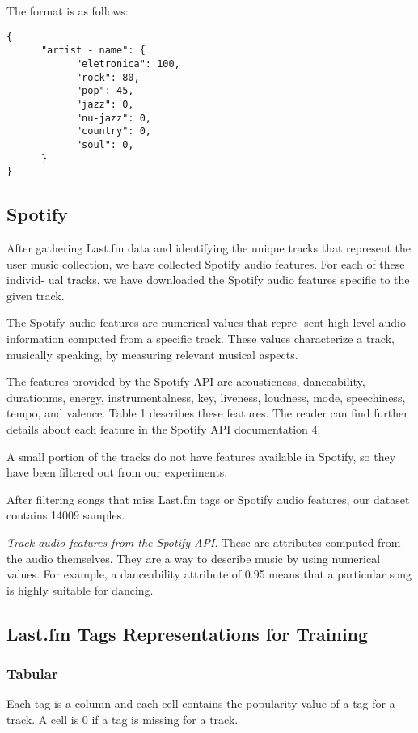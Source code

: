 \documentclass[fleqn,10pt]{olplainarticle}
\begin{document}
The format is as follows:

\begin{verbatim}
{
      "artist - name": {
            "eletronica": 100,
            "rock": 80,
            "pop": 45,
            "jazz": 0,
            "nu-jazz": 0,
            "country": 0,
            "soul": 0,
      }
}
\end{verbatim}


\subsection*{Spotify}

After gathering Last.fm data and identifying the unique
tracks that represent the user music collection, we have
collected Spotify audio features. For each of these individ-
ual tracks, we have downloaded the Spotify audio features
specific to the given track.

The Spotify audio features are numerical values that repre-
sent high-level audio information computed from a specific
track. These values characterize a track, musically speaking,
by measuring relevant musical aspects.

The features provided by the Spotify API are acousticness,
danceability, duration\textunderscore ms, energy, instrumentalness, key,
liveness, loudness, mode, speechiness, tempo, and valence.
Table 1 describes these features. The reader can find further
details about each feature in the Spotify API documentation
4.

A small portion of the tracks do not have features available in
Spotify, so they have been filtered out from our experiments.

After filtering songs that miss Last.fm tags or Spotify audio features,
our dataset contains 14009 samples.

\emph{Track audio features from the Spotify API}. These are
attributes computed from the audio themselves. They
are a way to describe music by using numerical values.
For example, a danceability attribute of 0.95 means
that a particular song is highly suitable for dancing.

\subsection*{Last.fm Tags Representations for Training}


\subsubsection*{Tabular}
Each tag is a column and each cell contains the popularity value of a tag for a track.
A cell is 0 if a tag is missing for a track.
\end{document}

